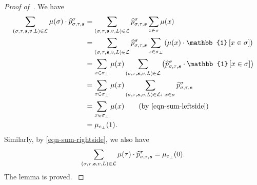 \documentclass[11pt]{article}
\newcommand{\set}[1]{\left\{#1\right\}}
\newcommand{\id}[1]{\mathbb{1}\left[#1\right]}
\def\!#1{\mathtt{#1}}
\newcommand{\seqS}{\boldsymbol{s}}
\newcommand{\qgl}[1]{{\color{purple}{#1}}}
\begin{document}
\begin{proof}[Proof of~]
    {
   We have
    \begin{align*}
        \sum_{(\sigma, \tau, \seqS,v,L) \in \mathcal L} \mu(\sigma)\cdot \widehat{p}_{\sigma, \tau, \seqS}^{\sigma} &= \sum_{(\sigma, \tau, \seqS,v,L) \in \mathcal L} \widehat{p}_{\sigma, \tau, \seqS}^{\sigma} \sum_{x \in \sigma} \mu(x) \\
        &= \sum_{(\sigma, \tau, \seqS,v,L) \in \mathcal L} \widehat{p}_{\sigma, \tau, \seqS}^{\sigma} \sum_{x \in \sigma_\bot} \left(\mu(x) \cdot  \id{x \in \sigma}\right) \\
        &= \sum_{x \in \sigma_\bot} \mu(x) \sum_{(\sigma, \tau, \seqS,v,L) \in \mathcal L} \left(\widehat{p}_{\sigma, \tau, \seqS}^{\sigma} \cdot \id{x \in \sigma}\right) \\
        &= \sum_{x \in \sigma_\bot} \mu(x) \sum_{(\sigma, \tau, \seqS,v,L) \in \+L : \ x \in \sigma} \widehat{p}_{\sigma, \tau, \seqS}^{\sigma} \\
        &= \sum_{x \in \sigma_\bot} \mu(x) \tag{by~\eqref{eqn-sum-leftside}} \\
        &= \mu_{e_\bot}(1).
    \end{align*}
    Similarly, by \eqref{eqn-sum-rightside}, we also have 
    \begin{align*}
    \sum_{(\sigma, \tau, \seqS,v,L) \in \+L}\mu(\tau)\cdot\widehat{p}_{\sigma, \tau, \seqS}^{\tau} = \mu_{e_{\bot}}(0).
    \end{align*}
    The lemma is proved.
    }
\end{proof}



           
                
                
\end{document}
